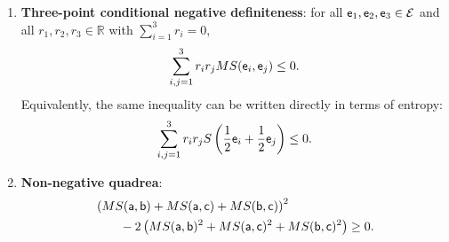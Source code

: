 \begin{prop}
\begin{enumerate}
		\item \textbf{Three-point conditional negative definiteness}: for all $\ens_1,\ens_2,\ens_3\in\Ens$ and all $r_1,r_2,r_3\in\mathbb{R}$ with $\sum_{i=1}^3 r_i=0$,
		\begin{equation}
			\sum_{i,j=1}^3 r_i r_j MS(\ens_i,\ens_j) \leq 0.
		\end{equation}
		Equivalently, the same inequality can be written directly in terms of entropy:
		\begin{equation}
			\sum_{i,j=1}^3 r_i r_j S\left(\frac{1}{2}\ens_i+\frac{1}{2}\ens_j\right) \leq 0.
		\end{equation}
		
		\item \textbf{Non-negative quadrea}:
		\begin{equation}
			\begin{aligned}
				&\left(MS(\ens[a],\ens[b])+MS(\ens[a],\ens[c])+MS(\ens[b],\ens[c])\right)^2\\
				&\qquad-2\left(MS(\ens[a],\ens[b])^2+MS(\ens[a],\ens[c])^2+MS(\ens[b],\ens[c])^2\right)\geq0.
			\end{aligned}
		\end{equation}
	\end{enumerate}
\end{prop}

